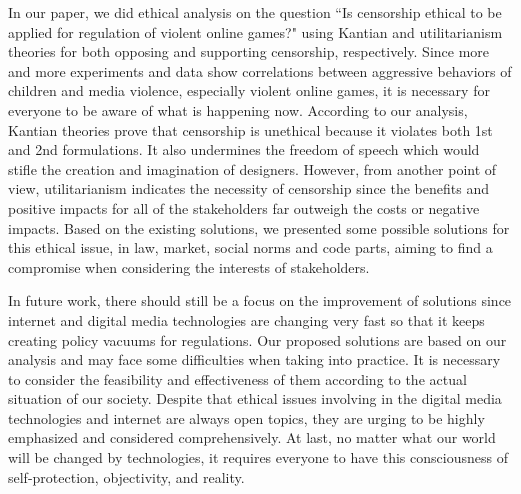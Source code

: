 
In our paper, we did ethical analysis on the question ``Is censorship ethical to be applied for regulation of violent online games?" using Kantian and utilitarianism theories for both opposing and supporting censorship, respectively. Since more and more experiments and data show correlations between aggressive behaviors of children and media violence, especially violent online games, it is necessary for everyone to be aware of what is happening now. According to our analysis, Kantian theories prove that censorship is unethical because it violates both 1st and 2nd formulations. It also undermines the freedom of speech which would stifle the creation and imagination of designers. However, from another point of view, utilitarianism indicates the necessity of censorship since the benefits and positive impacts for all of the stakeholders far outweigh the costs or negative impacts. Based on the existing solutions, we presented some possible solutions for this ethical issue, in law, market, social norms and code parts, aiming to find a compromise when considering the interests of stakeholders.

In future work, there should still be a focus on the improvement of solutions since internet and digital media technologies are changing very fast so that it keeps creating policy vacuums for regulations. Our proposed solutions are based on our analysis and may face some difficulties when taking into practice. It is necessary to consider the feasibility and effectiveness of them according to the actual situation of our society. Despite that ethical issues involving in the digital media technologies and internet are always open topics, they are urging to be highly emphasized and considered comprehensively. At last, no matter what our world will be changed by technologies, it requires everyone to have this consciousness of self-protection, objectivity, and reality.